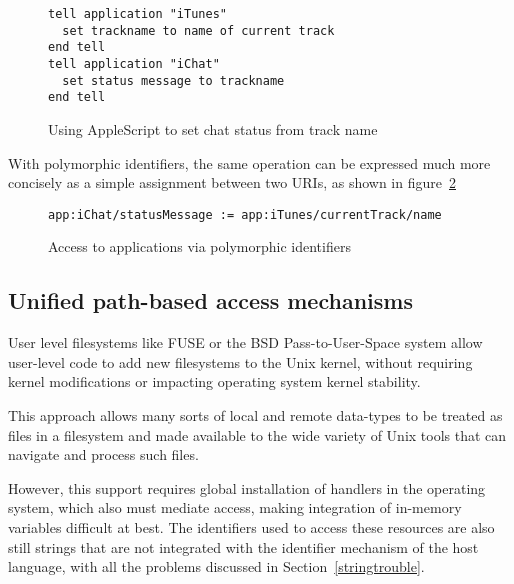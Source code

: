\documentclass[preprint,authoryear]{acm_proc_article-sp}
\begin{document}
\begin{figure}[htbp]
\begin{center}
\begin{small}
\begin{verbatim}
tell application "iTunes"
  set trackname to name of current track
end tell
tell application "iChat"
  set status message to trackname
end tell
\end{verbatim}
\end{small}
\caption{Using AppleScript to set chat status from track name}
\label{AppleScript}
\end{center}
\end{figure}

With polymorphic identifiers, the same operation can be expressed
much more concisely as a simple assignment between two URIs,
as shown in figure~\ref{NonAppleScript}

\begin{figure}[htbp]
\begin{center}
\begin{small}
\begin{verbatim}
app:iChat/statusMessage := app:iTunes/currentTrack/name
\end{verbatim}
\end{small}
\caption{Access to applications via polymorphic identifiers}
\label{NonAppleScript}
\end{center}
\end{figure}



\subsection{Unified path-based access mechanisms}


User level filesystems like FUSE\cite{fuse} or the BSD Pass-to-User-Space\cite{puffs} 
system allow
user-level code to add new filesystems to the Unix kernel, without requiring
kernel modifications or impacting operating system kernel stability.

This approach allows many sorts of local and remote data-types to be 
treated as files in a filesystem and made available to the wide variety
of Unix tools that can navigate and process such files.  

However, this support requires global installation of handlers in the operating
system, which also must mediate access, making integration of in-memory 
variables difficult at best.  The identifiers used to access these resources
are also still strings that are not integrated with the identifier mechanism of
the host language, with all the problems discussed in Section~\ref{stringtrouble}.
\end{document}
